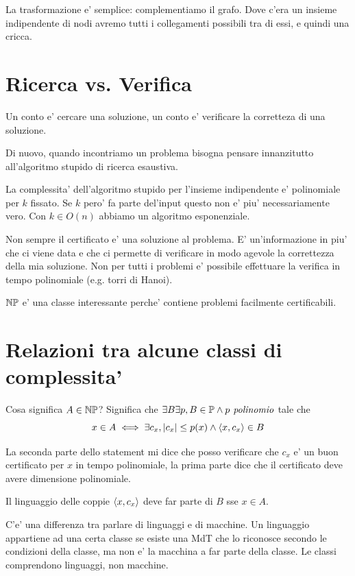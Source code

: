 La trasformazione e' semplice: complementiamo il grafo. Dove c'era un insieme indipendente di nodi
avremo tutti i collegamenti possibili tra di essi, e quindi una cricca.

\section{Ricerca vs. Verifica}


Un conto e' cercare una soluzione, un conto e' verificare la corretteza di una soluzione.

Di nuovo, quando incontriamo un problema bisogna pensare innanzitutto all'algoritmo stupido di
ricerca esaustiva.

La complessita' dell'algoritmo stupido per l'insieme indipendente e' polinomiale per $k$ fissato. Se $k$
pero' fa parte del'input questo non e' piu' necessariamente vero. Con $k \in O(n)$ abbiamo un
algoritmo esponenziale.

Non sempre il certificato e' una soluzione al problema. E' un'informazione in piu' che ci viene data
e che ci permette di verificare in modo agevole la correttezza della mia soluzione. Non per tutti i
problemi e' possibile effettuare la verifica in tempo polinomiale (e.g. torri di Hanoi).

$\mathbb{NP}$ e' una classe interessante perche' contiene problemi facilmente certificabili.

\section{Relazioni tra alcune classi di complessita'}

Cosa significa $A \in \mathbb{NP}$? Significa che $\exists B \exists p, B \in \mathbb{P} \land p\textit{ polinomio}$
tale che
\begin{equation*}
    x \in A \iff \exists c_{x}, |c_{x}| \leq p(x) \land \langle x, c_{x} \rangle \in B
\end{equation*}

La seconda parte dello statement mi dice che posso verificare che $c_{x}$ e' un buon certificato per
$x$ in tempo polinomiale, la prima parte dice che il certificato deve avere dimensione polinomiale.

Il linguaggio delle coppie $\langle x, c_{x} \rangle$ deve far parte di $B$ sse $x \in A$. 

C'e' una differenza tra parlare di linguaggi e di macchine. Un linguaggio appartiene ad una certa
classe se esiste una MdT che lo riconosce secondo le condizioni della classe, ma non e' la macchina
a far parte della classe. Le classi comprendono linguaggi, non macchine.

